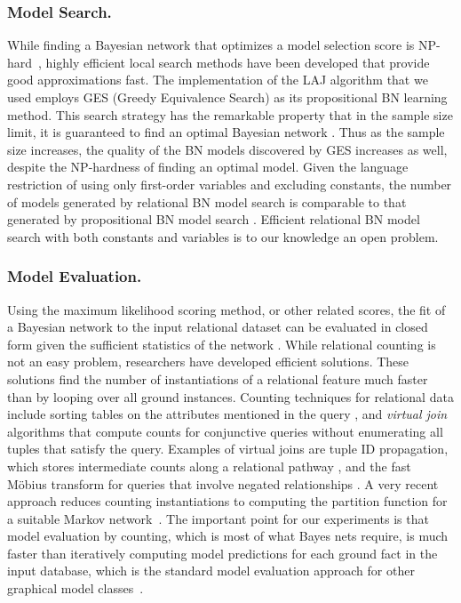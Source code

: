 \documentclass[runningheads,a4paper]{llncs}
\begin{document}
\subsubsection{Model Search.}
While finding a Bayesian network that optimizes a model selection score is NP-hard~\cite{Chickering2004}, highly efficient local search methods have been developed that provide good approximations fast. The implementation of the LAJ algorithm that we used employs GES (Greedy Equivalence Search) as its propositional BN learning method. This search strategy has the remarkable property that in the sample size limit, it is guaranteed to find an optimal Bayesian network \cite{Chickering2002}. Thus as the sample size increases, the quality of the BN models discovered by GES increases as well, despite the NP-hardness of finding an optimal model. Given the language restriction of using only first-order variables and excluding constants, the number of models generated by relational BN model search is comparable to that generated by propositional BN model search \cite{Schulte2012}. Efficient relational BN model search with both constants and variables is to our knowledge an open problem. 

\subsubsection{Model Evaluation.} \label{sec:counting} Using the maximum likelihood scoring method, or other related scores, the fit of a Bayesian network to the input relational dataset can be evaluated in closed form given the sufficient statistics of the network \cite{Friedman99prm,Schulte2011}.  
While relational counting is not an easy problem, researchers have developed efficient solutions. These solutions find the number of instantiations of a relational feature much faster than by looping over all ground instances. Counting techniques for relational data include sorting tables on the attributes mentioned in the query \cite{Ullman1982,Graefe1998}, and {\em virtual join} algorithms that compute counts for conjunctive queries without enumerating all tuples that satisfy the query. Examples of virtual joins are tuple ID propagation, which stores intermediate counts along a relational pathway \cite{Yin2004}, and the fast M\"obius transform for queries that involve negated relationships \cite{Qian2014a}. A very recent approach reduces counting instantiations to computing the partition function for a suitable Markov network~\cite{Venugopal2015}.
 The important point for our experiments is that model evaluation by counting, which is most of what Bayes nets require, is much faster than iteratively computing model predictions for each ground fact in the input database, which is the standard model evaluation approach for other graphical model classes~\cite[Sec.8.5.1]{Neville2007}. 
\end{document}
